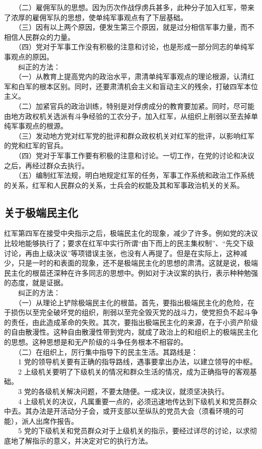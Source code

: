 \documentclass[cn,11pt,chinese]{elegantbook}
\def\myformat#1{\hfil\hfil #1}
\begin{document}
　　（二）雇佣军队的思想。因为历次作战俘虏兵甚多，此种分子加入红军，带来了浓厚的雇佣军队的思想，使单纯军事观点有了下层基础。\\
　　（三）因有以上两个原因，便发生第三个原因，就是过分相信军事力量，而不相信人民群众的力量。\\
　　（四）党对于军事工作没有积极的注意和讨论，也是形成一部分同志的单纯军事观点的原因。\\
　　纠正的方法：\\
　　（一）从教育上提高党内的政治水平，肃清单纯军事观点的理论根源，认清红军和白军的根本区别。同时，还要肃清机会主义和盲动主义的残余，打破四军本位主义。\\
　　（二）加紧官兵的政治训练，特别是对俘虏成分的教育要加紧。同时，尽可能由地方政权机关选派有斗争经验的工农分子，加入红军，从组织上削弱以至去掉单纯军事观点的根源。\\
　　（三）发动地方党对红军党的批评和群众政权机关对红军的批评，以影响红军的党和红军的官兵。\\
　　（四）党对于军事工作要有积极的注意和讨论。一切工作，在党的讨论和决议之后，再经过群众去执行。\\
　　（五）编制红军法规，明白地规定红军的任务，军事工作系统和政治工作系统的关系，红军和人民群众的关系，士兵会的权能及其和军事政治机关的关系。\\
\subsection*{\myformat{关于极端民主化}}
红军第四军在接受中央指示之后，极端民主化的现象，减少了许多。例如党的决议比较地能够执行了；要求在红军中实行所谓“由下而上的民主集权制”、“先交下级讨论，再由上级决议”等项错误主张，也没有人再提了。但是在实际上，这种减少，只是一时的和表面的现象，还不是极端民主化的思想的肃清。这就是说，极端民主化的根苗还深种在许多同志的思想中。例如对于决议案的执行，表示种种勉强的态度，就是证据。\\
　　纠正的方法：\\
　　（一）从理论上铲除极端民主化的根苗。首先，要指出极端民主化的危险，在于损伤以至完全破坏党的组织，削弱以至完全毁灭党的战斗力，使党担负不起斗争的责任，由此造成革命的失败。其次，要指出极端民主化的来源，在于小资产阶级的自由散漫性。这种自由散漫性带到党内，就成了政治上的和组织上的极端民主化的思想。这种思想是和无产阶级的斗争任务根本不相容的。\\
　　（二）在组织上，厉行集中指导下的民主生活。其路线是：\\
　　1 党的领导机关要有正确的指导路线，遇事要拿出办法，以建立领导的中枢。\\
　　2 上级机关要明了下级机关的情况和群众生活的情况，成为正确指导的客观基础。\\
　　3 党的各级机关解决问题，不要太随便。一成决议，就须坚决执行。\\
　　4 上级机关的决议，凡属重要一点的，必须迅速地传达到下级机关和党员群众中去。其办法是开活动分子会，或开支部以至纵队的党员大会（须看环境的可能），派人出席作报告。\\
　　5 党的下级机关和党员群众对于上级机关的指示，要经过详尽的讨论，以求彻底地了解指示的意义，并决定对它的执行方法。\\
\end{document}
